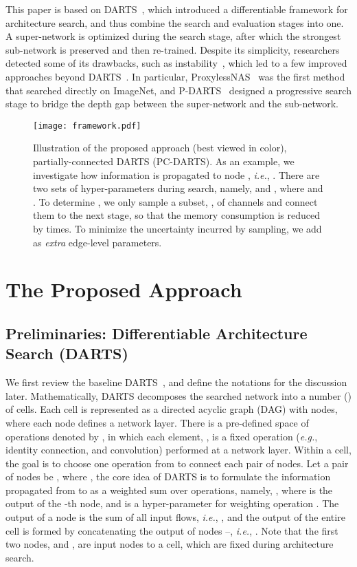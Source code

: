 \documentclass{article} \usepackage{iclr2020_conference,times}
\begin{document}
This paper is based on DARTS~\citep{liu2017hierarchical}, which introduced a differentiable framework for architecture search, and thus combine the search and evaluation stages into one. A super-network is optimized during the search stage, after which the strongest sub-network is preserved and then re-trained. Despite its simplicity, researchers detected some of its drawbacks, such as instability~\citep{Li2019RandomSA,Sciuto2019EvaluatingTS}, which led to a few improved approaches beyond DARTS~\citep{cai2018proxylessnas,chen2019progressive,mei2020atomnas}. In particular, ProxylessNAS~\citep{cai2018proxylessnas} was the first method that searched directly on ImageNet, and P-DARTS~\citep{chen2019progressive} designed a progressive search stage to bridge the depth gap between the super-network and the sub-network.

\begin{figure}[!t]
\renewcommand{\baselinestretch}{1.0}
\centering
\texttt{[image: framework.pdf]}\\
\caption{Illustration of the proposed approach (best viewed in color), partially-connected DARTS (PC-DARTS). As an example, we investigate how information is propagated to node , \textit{i.e.}, . There are two sets of  hyper-parameters during search, namely,  and , where  and . To determine , we only sample a subset, , of channels and connect them to the next stage, so that the memory consumption is reduced by  times. To minimize the uncertainty incurred by sampling, we add  as \textit{extra} edge-level parameters.}
\label{fig_framework}
\end{figure}


\section{The Proposed Approach}
\label{Approach}

\subsection{Preliminaries: Differentiable Architecture Search (DARTS)}

We first review the baseline DARTS~\citep{liu2018darts}, and define the notations for the discussion later. Mathematically, DARTS decomposes the searched network into a number () of cells. Each cell is represented as a directed acyclic graph (DAG) with  nodes, where each node defines a network layer. There is a pre-defined space of operations denoted by , in which each element, , is a fixed operation (\textit{e.g.}, identity connection, and  convolution) performed at a network layer. Within a cell, the goal is to choose one operation from  to connect each pair of nodes. Let a pair of nodes be , where , the core idea of DARTS is to formulate the information propagated from  to  as a weighted sum over  operations, namely, , where  is the output of the -th node, and  is a hyper-parameter for weighting operation . The output of a node is the sum of all input flows, \textit{i.e.}, , and the output of the entire cell is formed by concatenating the output of nodes --, \textit{i.e.}, . Note that the first two nodes,  and , are input nodes to a cell, which are fixed during architecture search.
\end{document}

